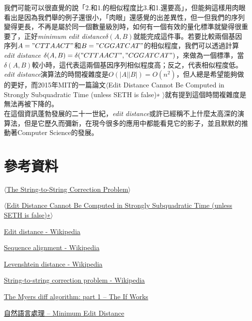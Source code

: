 \documentclass[15pt]{extarticle}
\begin{document}
我們可能可以很直覺的說「2.和1.的相似程度比3.和1.還要高」，但能夠這樣用肉眼看出是因為我們舉的例子還很小，「肉眼」還感覺的出差異性，但一但我們的序列變得更長，不再是屬於同一個數量級別時，如何有一個有效的量化標準就變得很重要了，正好\textit{minimum edit distance}$\delta(A,B)$就能完成這件事。若要比較兩個基因序列$A="CTTAACT"
$和$B="CGGATCAT"$的相似程度，我們可以透過計算\textit{edit distance} $\delta(A,B)=\delta("CTTAACT","CGGATCAT")$，來做為一個標準，當$\delta(A,B)$較小時，這代表這兩個基因序列相似程度高；反之，代表相似程度低。\\

\textit{edit distance}演算法的時間複雜度是$O(|A||B|)=O(n^2)$，但人總是希望能夠做的更好，而2015年MIT的一篇論文$\langle$Edit Distance Cannot Be Computed in Strongly Subquadratic Time
(unless SETH is false)∗ $\rangle$就有提到這個時間複雜度是無法再被下降的。\\

在這個資訊蓬勃發展的二十一世紀，\textit{edit distance}或許已經稱不上什麼太高深的演算法，但是它歷久而彌新，在現今很多的應用中都能看見它的影子，並且默默的推動著Computer Science的發展。

\section{參考資料}
\begin{enumerate}[label={[\arabic*]}, noitemsep]
    \item \href{http://citeseerx.ist.psu.edu/viewdoc/download?doi=10.1.1.367.5281&rep=rep1&type=pdf}{$\langle$The String-to-String Correction Problem$\rangle$}
    \item \href{https://arxiv.org/pdf/1412.0348.pdf}{$\langle$Edit Distance Cannot Be Computed in Strongly Subquadratic Time
(unless SETH is false)∗$\rangle$}
    \item \href{https://en.wikipedia.org/wiki/Edit_distance}{Edit distance - Wikipedia}
    \item \href{https://en.wikipedia.org/wiki/Sequence_alignment}{Sequence alignment - Wikipedia} 
    \item \href{https://en.wikipedia.org/wiki/Levenshtein_distance}{Levenshtein distance - Wikipedia}
    \item \href{https://en.wikipedia.org/wiki/String-to-string_correction_problem}{String-to-string correction problem - Wikipedia}
    \item \href{https://blog.jcoglan.com/2017/02/12/the-myers-diff-algorithm-part-1/}{The Myers diff algorithm: part 1 – The If Works}
    \item \href{http://cpmarkchang.logdown.com/posts/222651-minimum-edit-distance}{自然語言處理 -- Minimum Edit Distance}
    
    
\end{enumerate}
\end{document}
